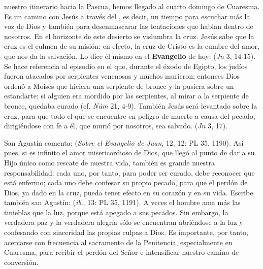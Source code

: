 \begin{body}
 nuestro itinerario hacia la Pascua, hemos llegado al cuarto domingo de Cuaresma. Es un camino con Jesús a través del , es decir, un tiempo para escuchar más la voz de Dios y también para desenmascarar las tentaciones que hablan dentro de nosotros. En el horizonte de este desierto se vislumbra la cruz. Jesús sabe que la cruz es el culmen de su misión: en efecto, la cruz de Cristo es la cumbre del amor, que nos da la salvación. Lo dice él mismo en el \textbf{Evangelio} de hoy:  (\textit{Jn} 3, 14-15). Se hace referencia al episodio en el que, durante el éxodo de Egipto, los judíos fueron atacados por serpientes venenosas y muchos murieron; entonces Dios ordenó a Moisés que hiciera una serpiente de bronce y la pusiera sobre un estandarte: si alguien era mordido por las serpientes, al mirar a la serpiente de bronce, quedaba curado (cf. \textit{Núm} 21, 4-9). También Jesús será levantado sobre la cruz, para que todo el que se encuentre en peligro de muerte a causa del pecado, dirigiéndose con fe a él, que murió por nosotros, sea salvado.  (\textit{Jn} 3, 17).

San Agustín comenta:  (\textit{Sobre el Evangelio de Juan}, 12, 12: PL 35, 1190). Así pues, si es infinito el amor misericordioso de Dios, que llegó al punto de dar a su Hijo único como rescate de nuestra vida, también es grande nuestra responsabilidad: cada uno, por tanto, para poder ser curado, debe reconocer que está enfermo; cada uno debe confesar su propio pecado, para que el perdón de Dios, ya dado en la cruz, pueda tener efecto en su corazón y en su vida. Escribe también san Agustín:  (\textit{ib}., 13: PL 35, 1191). A veces el hombre ama más las tinieblas que la luz, porque está apegado a sus pecados. Sin embargo, la verdadera paz y la verdadera alegría sólo se encuentran abriéndose a la luz y confesando con sinceridad las propias culpas a Dios. Es importante, por tanto, acercarse con frecuencia al sacramento de la Penitencia, especialmente en Cuaresma, para recibir el perdón del Señor e intensificar nuestro camino de conversión.
\end{body}


